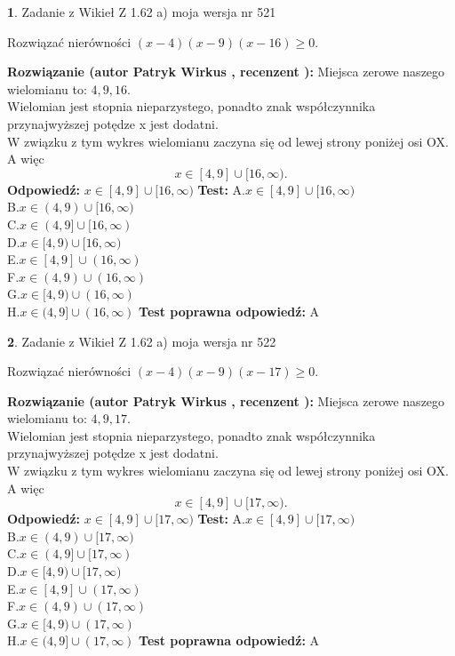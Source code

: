 \documentclass[12pt, a4paper]{article}
\theoremstyle{definition} %
\newtheorem{zad}{}
\newcommand{\zadStart}[1]{\begin{zad}#1\newline}
\newcommand{\zadStop}{\end{zad}}
\newcommand{\rozwStart}[2]{\noindent \textbf{Rozwiązanie (autor #1 , recenzent #2): }\newline}
\newcommand{\rozwStop}{\newline}
\newcommand{\odpStart}{\noindent \textbf{Odpowiedź:}\newline}
\newcommand{\odpStop}{\newline}
\newcommand{\testStart}{\noindent \textbf{Test:}\newline}
\newcommand{\testStop}{\newline}
\newcommand{\kluczStart}{\noindent \textbf{Test poprawna odpowiedź:}\newline}
\newcommand{\kluczStop}{\newline}
\begin{document}
\zadStart{Zadanie z Wikieł Z 1.62 a) moja wersja nr 521}

Rozwiązać nierówności $(x-4)(x-9)(x-16)\ge0$.
\zadStop
\rozwStart{Patryk Wirkus}{}
Miejsca zerowe naszego wielomianu to: $4, 9, 16$.\\
Wielomian jest stopnia nieparzystego, ponadto znak współczynnika przy\linebreak najwyższej potędze x jest dodatni.\\ W związku z tym wykres wielomianu zaczyna się od lewej strony poniżej osi OX. A więc $$x \in [4,9] \cup [16,\infty).$$
\rozwStop
\odpStart
$x \in [4,9] \cup [16,\infty)$
\odpStop
\testStart
A.$x \in [4,9] \cup [16,\infty)$\\
B.$x \in (4,9) \cup [16,\infty)$\\
C.$x \in (4,9] \cup [16,\infty)$\\
D.$x \in [4,9) \cup [16,\infty)$\\
E.$x \in [4,9] \cup (16,\infty)$\\
F.$x \in (4,9) \cup (16,\infty)$\\
G.$x \in [4,9) \cup (16,\infty)$\\
H.$x \in (4,9] \cup (16,\infty)$
\testStop
\kluczStart
A
\kluczStop



\zadStart{Zadanie z Wikieł Z 1.62 a) moja wersja nr 522}

Rozwiązać nierówności $(x-4)(x-9)(x-17)\ge0$.
\zadStop
\rozwStart{Patryk Wirkus}{}
Miejsca zerowe naszego wielomianu to: $4, 9, 17$.\\
Wielomian jest stopnia nieparzystego, ponadto znak współczynnika przy\linebreak najwyższej potędze x jest dodatni.\\ W związku z tym wykres wielomianu zaczyna się od lewej strony poniżej osi OX. A więc $$x \in [4,9] \cup [17,\infty).$$
\rozwStop
\odpStart
$x \in [4,9] \cup [17,\infty)$
\odpStop
\testStart
A.$x \in [4,9] \cup [17,\infty)$\\
B.$x \in (4,9) \cup [17,\infty)$\\
C.$x \in (4,9] \cup [17,\infty)$\\
D.$x \in [4,9) \cup [17,\infty)$\\
E.$x \in [4,9] \cup (17,\infty)$\\
F.$x \in (4,9) \cup (17,\infty)$\\
G.$x \in [4,9) \cup (17,\infty)$\\
H.$x \in (4,9] \cup (17,\infty)$
\testStop
\kluczStart
A
\kluczStop
\end{document}
